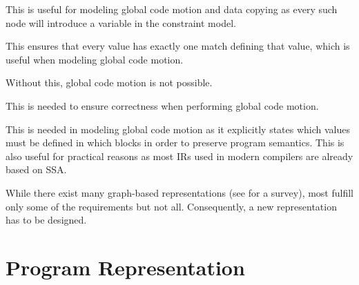 \begin{requirements}
  \item {}
    This is useful for modeling \gls{global code motion} and \gls{data copying}
    as every such \gls{node} will introduce a \gls{variable} in the
    \gls{constraint model}.

  \item {}
    This ensures that every value has exactly one \gls{match} defining that
    value, which is useful when modeling \gls{global code motion}.

  \item {}
    Without this, \gls{global code motion} is not possible.

  \item {}
    This is needed to ensure correctness when performing \gls{global code
      motion}.

  \item {}
    This is needed in modeling \gls{global code motion} as it explicitly
    states which values must be defined in which \glspl{block} in order to
    preserve \gls{program} semantics.
    This is also useful for practical reasons as most \glspl{IR} used in modern
    \glspl{compiler} are already based on \gls{SSA}.
\end{requirements}

While there exist many \gls{graph}-based representations (see
\cite{StanierWatson:2013} for a survey), most fulfill only some of the
requirements but not all.
%
Consequently, a new representation has to be designed.


\section{Program Representation}

